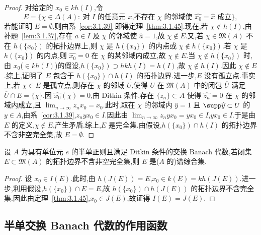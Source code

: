 \begin{proof}
对给定的 $x_{0} \in kh(I)$,令
\begin{equation*}
E = \{\chi \in \Delta(A):\ \text{对 } I \text{ 的任意元 } x \text{,不存在 } \chi \text{ 的邻域使 } \widehat{x_{0}} = \widehat{x} \text{ 成立}\},
\end{equation*}
若能证明 $E = \emptyset$,则由系~\ref{cor:3.1.39} 即得定理~\ref{thm:3.1.45}.现在,若 $\chi \notin h(I)$,由补题~\ref{lem:3.1.37},存在 $a \in I$ 及 $\chi$ 的邻域使 $\widehat{a} = 1$,故 $\chi \notin E$.又,若 $\chi \in \mathfrak{M}(A)$ 不在 $h(\{x_{0}\})$ 的拓扑边界上,则 $\chi$ 是 $h(\{x_{0}\})$ 的内点或 $\chi \notin h(\{x_{0}\})$.若 $\chi$ 是 $h(\{x_{0}\})$ 的内点,则 $\widehat{x_{0}} = 0$ 在 $\chi$ 的某邻域内成立,故 $\chi \notin E$.当 $\chi \notin h(\{x_{0}\})$ 时,由 $x_{0}$($\in kh(I)$)的假设,$h(\{x_{0}\}) \supset hkh(I) = h(I)$,故 $\chi \notin h(I)$.因此 $\chi \notin E$.综上,证明了 $E$ 包含于 $h(\{x_{0}\}) \cap h(I)$ 的拓扑边界.进一步,$E$ 没有孤立点.事实上,若 $\chi \in E$ 是孤立点,则存在 $\chi$ 的邻域 $U$,使得 $U$ 在 $\mathfrak{M}(A)$ 中的闭包 $\overline{U}$ 满足 $\overline{U} \cap E = \{\chi\}$.因 $\widehat{x_{0}}(\chi) = 0$,由 Ditkin 条件,存在 $\{z_{n}\} \subset A$ 使得 $\widehat{z_{n}} = 0$ 在 $\chi$ 的邻域内成立,且 $\lim_{n \to \infty} z_{n}x_{0} = x_{0}$.此时,取在 $\chi$ 的邻域内 $\widehat{y} = 1$ 且 $\supp \widehat{y} \subset U$ 的 $y \in A$,由系~\ref{cor:3.1.39},$z_{n}yx_{0} \in I$.因此由 $\lim_{n \to \infty} z_{n}yx_{0} = yx_{0} \in I$,$yx_{0} \in I$.于是由 $E$ 的定义,$\chi \notin E$,产生矛盾.综上,$E$ 是完全集.由假设,$h(\{x_{0}\}) \cap h(I)$ 的拓扑边界不含非空完全集,故 $E = \emptyset$.
\end{proof}

\begin{corollary}\label{cor:3.1.46}
设 $A$ 为具有单位元 $e$ 的半单正则且满足 Ditkin 条件的交换 Banach 代数,若闭集 $E \subset \mathfrak{M}(A)$ 的拓扑边界不含非空完全集,则 $E$ 是($A$ 的)谱综合集.
\end{corollary}

\begin{proof}
设 $x_{0} \in I(E)$.此时,由 $h(J(E)) = E$,$x_{0} \in k(E) = kh(J(E))$.进一步,利用假设,$h(\{x_{0}\}) \cap E = E$,故 $h(\{x_{0}\}) \cap h(J(E))$ 的拓扑边界不含完全集.因此由定理~\ref{thm:3.1.45},$x_{0} \in J(E)$,故证得 $I(E) = J(E)$.
\end{proof}

\subsection{半单交换 Banach 代数的作用函数}\label{sec:3.1.7}

